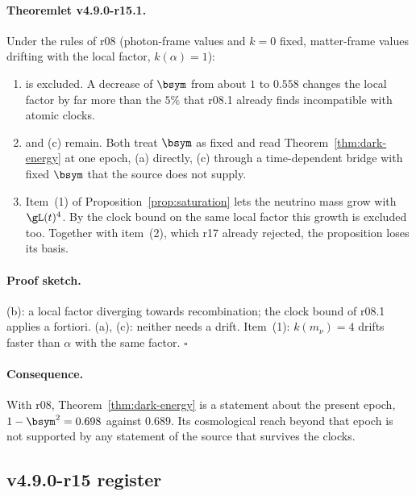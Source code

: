 \paragraph{Theoremlet v4.9.0-r15.1.}
Under the rules of r08 (photon-frame values and \(k=0\) fixed, matter-frame values drifting with the local factor,
\(k(\alpha)=1\)):
\begin{enumerate}[leftmargin=2em]
\item[(b)] is excluded.  A decrease of \(\bsym\) from about \(1\) to \(0.558\) changes the local factor by far more than the
\(5\%\) that r08.1 already finds incompatible with atomic clocks.
\item[(a)] and (c) remain.  Both treat \(\bsym\) as fixed and read Theorem~\ref{thm:dark-energy} at one epoch, (a) directly,
(c) through a time-dependent bridge with fixed \(\bsym\) that the source does not supply.
\item Item~(1) of Proposition~\ref{prop:saturation} lets the neutrino mass grow with \(\gL(t)^4\).  By the clock bound on the
same local factor this growth is excluded too.  Together with item~(2), which r17 already rejected, the proposition loses
its basis.
\end{enumerate}

\paragraph{Proof sketch.}
(b): a local factor diverging towards recombination; the clock bound of r08.1 applies a fortiori.  (a), (c): neither needs a
drift.  Item~(1): \(k(m_\nu)=4\) drifts faster than \(\alpha\) with the same factor.  \(\square\)

\paragraph{Consequence.}
With r08, Theorem~\ref{thm:dark-energy} is a statement about the present epoch, \(1-\bsym^2=0.698\) against \(0.689\).
Its cosmological reach beyond that epoch is not supported by any statement of the source that survives the clocks.

\subsection*{v4.9.0-r15 register}
\label{subsec:v490-r15-register}

